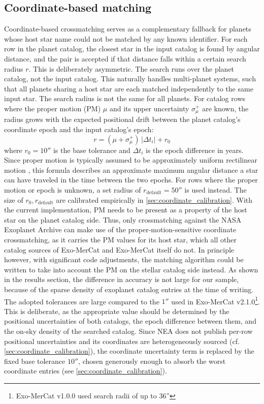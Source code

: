 \subsection{Coordinate-based matching}
Coordinate-based crossmatching serves as a complementary fallback for planets whose host star name could not be matched by any known identifier. For each row in the planet catalog, the closest star in the input catalog is found by angular distance, and the pair is accepted if that distance falls 
within a certain search radius $r$.
This is deliberately asymmetric. The search runs over the planet catalog, not the input catalog. This naturally handles multi-planet systems, such that all planets sharing a host star are each matched independently to the same input star. 
The search radius is not the same for all planets. For catalog rows where the proper motion (PM) $\mu$ and its upper uncertainty $\sigma^+_\mu$ are known, the radius grows with the  expected positional drift between the planet catalog's coordinate epoch and the input catalog's epoch:
\begin{equation}
\label{eq:proper_motion_radius}
    r = (\mu + \sigma_{\mu}^+)\,|\Delta t_i| + r_0
\end{equation}
where $r_0 = 10''$ is the base tolerance and $\Delta t_i$ is the epoch difference in years.  
Since proper motion is typically assumed to be approximately uniform rectilinear motion \cite{GaiaEDR3Astrometry}, this formula describes an approximate maximum angular distance a star can have traveled in the time between the two epochs.
For rows where the proper motion or epoch is unknown, a set radius of $r_{\text{default}} = 50''$ is used instead. The size of $r_{0}, r_{\text{default}}$ are calibrated empirically in \cref{sec:coordinate_calibration}.
With the current implementation, PM needs to be present as a property of the host star on the planet catalog side. Thus, only crossmatching against the NASA Exoplanet Archive can make use of the proper-motion-sensitive coordinate crossmatching, as it carries the PM values for its host star, which all other catalog sources of Exo-MerCat and Exo-MerCat itself do not. In principle however, with significant code adjustments, the matching algorithm could be written to take into account the PM on the stellar catalog side instead. As shown in the results section, the difference in accuracy is not large for our sample, because of the sparse density of exoplanet catalog entries at the time of writing.
The adopted tolerances are large compared to the $1''$ used in Exo-MerCat v2.1.0\footnote{Exo-MerCat v1.0.0 used search radii of up to 36''}\cite{Alei_2025}. This is deliberate, as the appropriate value should be determined by the positional uncertainties of both catalogs, the epoch difference between them, and the on-sky density of the searched catalog. Since NEA does not publish per-row positional uncertainties and its coordinates are heterogeneously sourced (cf. \cref{sec:coordinate_calibration}), the coordinate uncertainty term is replaced by the fixed base tolerance $10''$, chosen generously enough to absorb the worst coordinate entries (see \cref{sec:coordinate_calibration}). 
